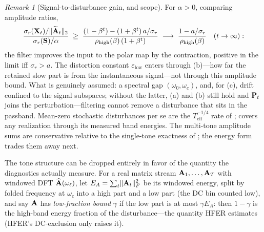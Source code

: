 \documentclass[11pt,a4paper]{article}
\theoremstyle{remark}
\newtheorem{remark}{Remark}
\newcommand{\Teff}{T_{\mathrm{eff}}}
\newcommand{\rhohigh}{\rho_{\mathrm{high}}}
\newcommand{\epslow}{\varepsilon_{\mathrm{low}}}
\begin{document}
\begin{remark}[Signal-to-disturbance gain, and scope]
\label{rem:sdr}
For $\alpha>0$, comparing amplitude ratios,
\[
\frac{\sigma_r(\Xbf_t)/\lVert\tilde\Abf_t\rVert_2}{\sigma_r(\Sbf)/\alpha}
\;\ge\;\frac{(1-\beta^t)-(1+\beta^t)\,a/\sigma_r}{\rhohigh(\beta)\,(1+\beta^t)}
\;\longrightarrow\;\frac{1-a/\sigma_r}{\rhohigh(\beta)}\quad(t\to\infty):
\]
the filter improves the input to the polar map by the  contraction, positive in the limit iff $\sigma_r>a$.
The distortion constant $\epslow$ enters through (b)---how far the retained slow part is from the instantaneous signal---not through this amplitude bound.
What is genuinely assumed: a spectral gap $(\omega_0,\omega_c)$, and, for (c), drift confined to the signal subspaces; without the latter, (a) and (b) still hold and $\mathbf{P}_t$ joins the perturbation---filtering cannot remove a disturbance that sits in the passband.
Mean-zero stochastic disturbances per se are the $\Teff^{-1/4}$ rate of \citealp{li2026denoise};  covers any realization through its measured band energies.
The multi-tone amplitude sums are conservative relative to the single-tone exactness of ; the energy form trades them away next.
\end{remark}

The tone structure can be dropped entirely in favor of the quantity the diagnostics actually measure.
For a real matrix stream $\mathbf{A}_1,\dots,\mathbf{A}_T$ with windowed DFT $\widehat{\mathbf{A}}(\omega_\ell)$, let $E_A=\sum_t\lVert\mathbf{A}_t\rVert_F^2$ be its windowed energy, split by folded frequency at $\omega_c$ into a high part and a low part (the DC bin counted low), and say $\mathbf{A}$ has \emph{low-fraction bound} $\gamma$ if the low part is at most $\gamma E_A$: then $1-\gamma$ is the high-band energy fraction of the disturbance---the quantity HFER estimates (HFER's DC-exclusion only raises it).
\end{document}
